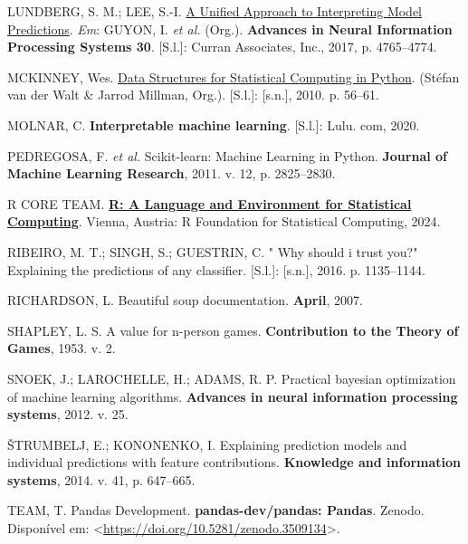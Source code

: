 \documentclass[
  12pt,
  a4paper,
]{scrreprt}
\newlength{\cslhangindent}
\newenvironment{CSLReferences}[2] %
 {\begin{list}{}{%
  \setlength{\itemindent}{0pt}
  \setlength{\leftmargin}{0pt}
  \setlength{\parsep}{0pt}
  \ifodd #1
   \setlength{\leftmargin}{\cslhangindent}
   \setlength{\itemindent}{-1\cslhangindent}
  \fi
  \setlength{\itemsep}{#2\baselineskip}}}
 {\end{list}}
\begin{document}
\begin{CSLReferences}{0}{1}
LUNDBERG, S. M.; LEE, S.-I.
\href{http://papers.nips.cc/paper/7062-a-unified-approach-to-interpreting-model-predictions.pdf}{A
Unified Approach to Interpreting Model Predictions}. \emph{Em}: GUYON,
I. \emph{et al.} (Org.). \textbf{Advances in Neural Information
Processing Systems 30}. {[}S.l.{]}: Curran Associates, Inc., 2017, p.
4765--4774.

MCKINNEY, Wes.
\href{https://doi.org/\%2010.25080/Majora-92bf1922-00a\%20}{{D}ata
{S}tructures for {S}tatistical {C}omputing in {P}ython}. (Stéfan van der
Walt \& Jarrod Millman, Org.). {[}S.l.{]}: {[}s.n.{]}, 2010. p. 56--61.

MOLNAR, C. \textbf{Interpretable machine learning}. {[}S.l.{]}: Lulu.
com, 2020.

PEDREGOSA, F. \emph{et al.} Scikit-learn: Machine Learning in {P}ython.
\textbf{Journal of Machine Learning Research}, 2011. v. 12, p.
2825--2830.

R CORE TEAM. \textbf{\href{https://www.R-project.org/}{R: A Language and
Environment for Statistical Computing}}. Vienna, Austria: R Foundation
for Statistical Computing, 2024.

RIBEIRO, M. T.; SINGH, S.; GUESTRIN, C. " Why should i trust you?"
Explaining the predictions of any classifier. {[}S.l.{]}: {[}s.n.{]},
2016. p. 1135--1144.

RICHARDSON, L. Beautiful soup documentation. \textbf{April}, 2007.

SHAPLEY, L. S. A value for n-person games. \textbf{Contribution to the
Theory of Games}, 1953. v. 2.

SNOEK, J.; LAROCHELLE, H.; ADAMS, R. P. Practical bayesian optimization
of machine learning algorithms. \textbf{Advances in neural information
processing systems}, 2012. v. 25.

ŠTRUMBELJ, E.; KONONENKO, I. Explaining prediction models and individual
predictions with feature contributions. \textbf{Knowledge and
information systems}, 2014. v. 41, p. 647--665.

TEAM, T. Pandas Development. \textbf{pandas-dev/pandas: Pandas}. Zenodo.
Disponível em:
\textless{}\url{https://doi.org/10.5281/zenodo.3509134}\textgreater.


\end{CSLReferences}
\end{document}
